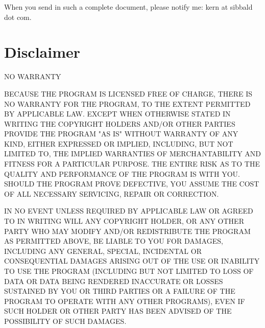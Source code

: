 When you send in such a
complete document, please notify me: kern at sibbald dot com.


\section{Disclaimer}

NO WARRANTY 

BECAUSE THE PROGRAM IS LICENSED FREE OF CHARGE, THERE IS NO WARRANTY FOR THE
PROGRAM, TO THE EXTENT PERMITTED BY APPLICABLE LAW. EXCEPT WHEN OTHERWISE
STATED IN WRITING THE COPYRIGHT HOLDERS AND/OR OTHER PARTIES PROVIDE THE
PROGRAM "AS IS" WITHOUT WARRANTY OF ANY KIND, EITHER EXPRESSED OR IMPLIED,
INCLUDING, BUT NOT LIMITED TO, THE IMPLIED WARRANTIES OF MERCHANTABILITY AND
FITNESS FOR A PARTICULAR PURPOSE. THE ENTIRE RISK AS TO THE QUALITY AND
PERFORMANCE OF THE PROGRAM IS WITH YOU. SHOULD THE PROGRAM PROVE DEFECTIVE,
YOU ASSUME THE COST OF ALL NECESSARY SERVICING, REPAIR OR CORRECTION. 

IN NO EVENT UNLESS REQUIRED BY APPLICABLE LAW OR AGREED TO IN WRITING WILL ANY
COPYRIGHT HOLDER, OR ANY OTHER PARTY WHO MAY MODIFY AND/OR REDISTRIBUTE THE
PROGRAM AS PERMITTED ABOVE, BE LIABLE TO YOU FOR DAMAGES, INCLUDING ANY
GENERAL, SPECIAL, INCIDENTAL OR CONSEQUENTIAL DAMAGES ARISING OUT OF THE USE
OR INABILITY TO USE THE PROGRAM (INCLUDING BUT NOT LIMITED TO LOSS OF DATA OR
DATA BEING RENDERED INACCURATE OR LOSSES SUSTAINED BY YOU OR THIRD PARTIES OR
A FAILURE OF THE PROGRAM TO OPERATE WITH ANY OTHER PROGRAMS), EVEN IF SUCH
HOLDER OR OTHER PARTY HAS BEEN ADVISED OF THE POSSIBILITY OF SUCH DAMAGES. 
